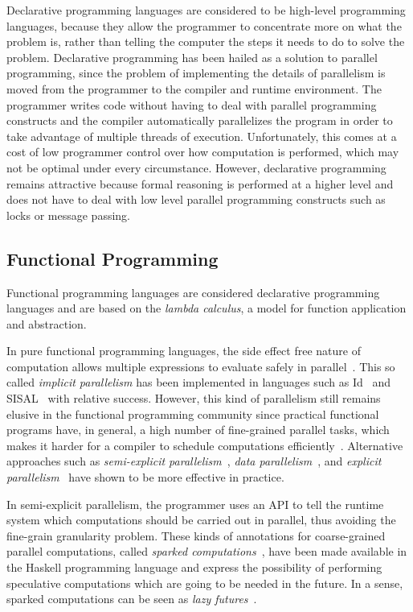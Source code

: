 Declarative programming languages are considered to be high-level programming
languages, because they allow the programmer to concentrate more on what the
problem is, rather than telling the computer the steps it needs to do to solve
the problem. Declarative programming has been hailed as a solution to parallel
programming, since the problem of implementing the details of parallelism is
moved from the programmer to the compiler and runtime environment. The
programmer writes code without having to deal with parallel programming
constructs and the compiler automatically parallelizes the program in order to
take advantage of multiple threads of execution. Unfortunately, this comes at a
cost of low programmer control over how computation is performed, which may not
be optimal under every circumstance. However, declarative programming remains
attractive because formal reasoning is performed at a higher level and does not
have to deal with low level parallel programming constructs such as locks or
message passing.

\subsection{Functional Programming}

Functional programming languages are considered declarative programming
languages and are based on the \emph{lambda calculus}, a model for function
application and abstraction.

In pure functional programming languages, the side effect free nature of
computation allows multiple expressions to evaluate safely in
parallel~\cite{Loidl:2003}. This so called \emph{implicit parallelism} has been
implemented in languages such as Id~\cite{Nikhil93anoverview} and
SISAL~\cite{gaudiot2001sisal} with relative success. However, this kind of
parallelism still remains elusive in the functional programming community since
practical functional programs have, in general, a high number of fine-grained
parallel tasks, which makes it harder for a compiler to schedule computations
efficiently~\cite{haskell_tutorial}.  Alternative approaches such as
\emph{semi-explicit parallelism}~\cite{Marlow:2010}, \emph{data
parallelism}~\cite{Blelloch:1996:PPA:227234.227246,Chakravarty07dataparallel,peytonjones:2008},
and \emph{explicit parallelism}~\cite{harris2005composable} have shown to be
more effective in practice.

In semi-explicit parallelism, the programmer uses an API to tell the runtime
system which computations should be carried out in parallel, thus avoiding the
fine-grain granularity problem. These kinds of annotations for coarse-grained
parallel computations, called \emph{sparked computations}~\cite{Marlow:2010},
have been made available in the Haskell programming language and express the
possibility of performing speculative computations which are going to be needed
in the future. In a sense, sparked computations can be seen as \emph{lazy
futures}~\cite{Baker:1977}.

